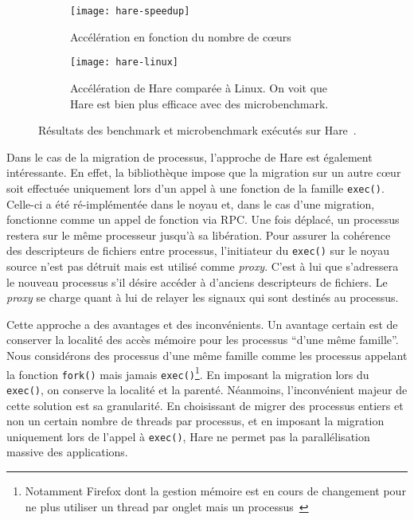       \begin{figure}[ht]
        \begin{subfigure}[b]{0.5\textwidth}
          \texttt{[image: hare-speedup]}
          \caption{Accélération en fonction du nombre de c\oe urs}
        \end{subfigure}
        \begin{subfigure}[b]{0.5\textwidth}
          \texttt{[image: hare-linux]}
          \caption{Accélération de Hare comparée à Linux. On voit que Hare est
            bien plus efficace avec des microbenchmark.}
        \end{subfigure}
        \caption{Résultats des benchmark et microbenchmark exécutés sur
          Hare~\citep{gruenwald2014providing}.}
        \label{fig:hare-res}
      \end{figure}

      Dans le cas de la migration de processus, l'approche de Hare est également
      intéressante. En effet, la bibliothèque impose que la migration sur un
      autre c\oe ur soit effectuée uniquement lors d'un appel à une fonction de
      la famille \texttt{exec()}. Celle-ci a été ré-implémentée dans le noyau
      et, dans le cas d'une migration, fonctionne comme un appel de fonction via
      RPC. Une fois déplacé, un processus restera sur le même processeur jusqu'à
      sa libération. Pour assurer la cohérence des descripteurs de fichiers
      entre processus, l'initiateur du \texttt{exec()} sur le noyau source n'est
      pas détruit mais est utilisé comme \textit{proxy}. C'est à lui que
      s'adressera le nouveau processus s'il désire accéder à d'anciens
      descripteurs de fichiers. Le \textit{proxy} se charge quant à lui de
      relayer les signaux qui sont destinés au processus.

      \enlargethispage{2mm} %

      Cette approche a des avantages et des inconvénients. Un avantage certain
      est de conserver la localité des accès mémoire pour les processus ``d'une
      même famille''. Nous considérons des processus d'une même famille comme
      les processus appelant la fonction \texttt{fork()} mais jamais
      \texttt{exec()}\footnote{Notamment Firefox dont la gestion mémoire est en
        cours de changement pour ne plus utiliser un thread par onglet mais un
        processus~\citep{mozillaElectrolysis}}. En imposant la migration lors du
      \texttt{exec()}, on conserve la localité et la parenté. Néanmoins,
      l'inconvénient majeur de cette solution est sa granularité. En choisissant
      de migrer des processus entiers et non un certain nombre de threads par
      processus, et en imposant la migration uniquement lors de l'appel à
      \texttt{exec()}, Hare ne permet pas la parallélisation massive des
      applications.


